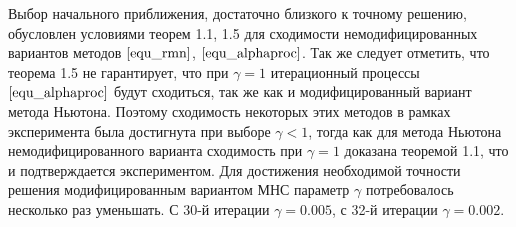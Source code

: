 Выбор начального приближения, достаточно близкого к точному решению, обусловлен условиями теорем 1.1, 1.5 для сходимости немодифицированных вариантов методов $\eqref{equ_rmn}$, $\eqref{equ_alphaproc}$. Так же следует отметить, что теорема 1.5 не гарантирует, что при $\gamma=1$ итерационный процессы $\eqref{equ_alphaproc}$ будут сходиться, так же как и модифицированный вариант метода Ньютона. Поэтому сходимость некоторых этих методов в рамках эксперимента была достигнута при выборе $\gamma<1$, тогда как для метода Ньютона немодифицированного варианта сходимость при $\gamma=1$ доказана теоремой 1.1, что и подтверждается экспериментом. Для достижения необходимой точности решения модифицированным вариантом МНС параметр $\gamma$ потребовалось несколько раз уменьшать. С 30-й итерации $\gamma=0.005$, с 32-й итерации $\gamma=0.002$.


